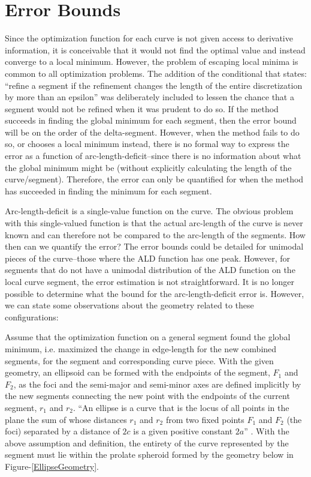 \section{Error Bounds}
Since the optimization function for each curve is not given access to 
derivative information, it is conceivable that it would not find the 
optimal value and instead converge to a local minimum.  However, the 
problem of escaping local minima is common to all optimization problems.  
The addition of the conditional that states: ``refine a segment if the 
refinement changes the length of the entire discretization by more than an 
epsilon'' was deliberately included to lessen the chance that a segment 
would not be refined when it was prudent to do so.  If the method succeeds 
in finding the global minimum for each segment, then the error bound will 
be on the order of the delta-segment.  However, when the method fails to 
do so, or chooses a local minimum instead, there is no formal way to 
express the error as a function of arc-length-deficit--since there is no 
information about what the global minimum might be (without explicitly 
calculating the length of the curve/segment).  Therefore, the error can 
only be quantified for when the method has succeeded in finding the 
minimum for each segment.

        Arc-length-deficit is a single-value function on the curve.  The 
obvious problem with this single-valued function is that the actual 
arc-length of the curve is never known and can therefore not be compared 
to the arc-length of the segments.  How then can we quantify the error?  
The error bounds could be detailed for unimodal pieces of the curve--those 
where the ALD function has one peak.  However, for segments that do 
not have a unimodal distribution of the ALD function on the local curve segment, the error estimation is not straightforward.  It is no longer possible to determine what the bound for the arc-length-deficit error is.  However, we can state some observations about the geometry related to these configurations:

Assume that the optimization function on a general segment found the global minimum, i.e. maximized the change in edge-length for the new combined segments, for the segment and corresponding curve piece.  With the given geometry, an ellipsoid can be formed with the endpoints of the segment, $F_1$ and $F_2$, as the foci and the semi-major and semi-minor axes are defined implicitly by the new segments connecting the new point with the endpoints of the current segment, $r_1$ and $r_2$.  ``An ellipse is a curve that is the locus of all points in the plane the sum of whose distances $r_1$ and $r_2$ from two fixed points $F_1$ and $F_2$ (the foci) separated by a distance of $2c$ is a given positive constant $2a$'' \cite{weissteine}.  With the above assumption and definition, the entirety of the curve represented by the segment must lie within the prolate spheroid  formed by the geometry below in Figure-\ref{EllipseGeometry}.

